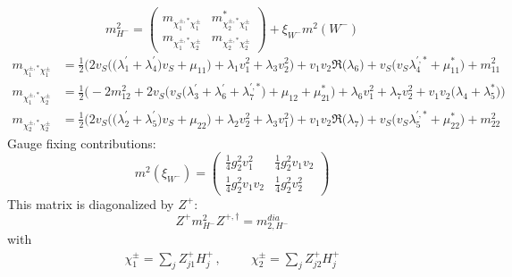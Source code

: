 \begin{itemize}
\begin{equation} 
m^2_{H^-} = \left( 
\begin{array}{cc}
m_{\chi_1^{\pm,*}\chi_1^\pm} &m^*_{\chi_2^{\pm,*}\chi_1^\pm}\\ 
m_{\chi_1^{\pm,*}\chi_2^\pm} &m_{\chi_2^{\pm,*}\chi_2^\pm}\end{array} 
\right) +  \xi_{W^-}m^2(W^-) 
 \end{equation} 
\begin{align} 
m_{\chi_1^{\pm,*}\chi_1^\pm} &= \frac{1}{2} \Big(2 v_S \Big(\Big(\lambda^{\prime}_1 + \lambda^{\prime}_4\Big)v_S  + \mu_{11}\Big) + \lambda_1 v_{1}^{2}  + \lambda_3 v_{2}^{2} \Big) + v_1 v_2 {\Re\Big(\lambda_6\Big)}  + v_S \Big(v_S \lambda^{{\prime},*}_4  + \mu_{11}^*\Big) + m^2_{11}\\ 
m_{\chi_1^{\pm,*}\chi_2^\pm} &= \frac{1}{2} \Big(-2 m^2_{12}  + 2 v_S \Big(v_S \Big(\lambda^{\prime}_3 + \lambda^{\prime}_6 + \lambda^{{\prime},*}_7\Big) + \mu_{12} + \mu_{21}^*\Big) + \lambda_6 v_{1}^{2}  + \lambda_7 v_{2}^{2}  + v_1 v_2 \Big(\lambda_4 + \lambda_5^*\Big)\Big)\\ 
m_{\chi_2^{\pm,*}\chi_2^\pm} &= \frac{1}{2} \Big(2 v_S \Big(\Big(\lambda^{\prime}_2 + \lambda^{\prime}_5\Big)v_S  + \mu_{22}\Big) + \lambda_2 v_{2}^{2}  + \lambda_3 v_{1}^{2} \Big) + v_1 v_2 {\Re\Big(\lambda_7\Big)}  + v_S \Big(v_S \lambda^{{\prime},*}_5  + \mu_{22}^*\Big) + m^2_{22}
\end{align} 
Gauge fixing contributions: 
\begin{equation} 
m^2 (\xi_{W^-}) = \left( 
\begin{array}{cc}
\frac{1}{4} g_{2}^{2} v_{1}^{2}  &\frac{1}{4} g_{2}^{2} v_1 v_2 \\ 
\frac{1}{4} g_{2}^{2} v_1 v_2  &\frac{1}{4} g_{2}^{2} v_{2}^{2} \end{array} 
\right) 
 \end{equation} 
This matrix is diagonalized by \(Z^+\): 
\begin{equation} 
Z^+ m^2_{H^-} Z^{+,\dagger} = m^{dia}_{2,H^-} 
\end{equation} 
with 
\begin{align} 
\chi_1^\pm = \sum_{j}Z_{{j 1}}^{+}H^+_{{j}}\,, \hspace{1cm} 
\chi_2^\pm = \sum_{j}Z_{{j 2}}^{+}H^+_{{j}}
\end{align} 
\end{itemize} 
